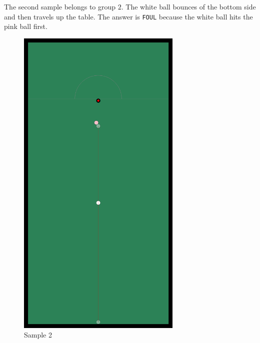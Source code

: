 The second sample belongs to group $2$. The white ball bounces of the bottom side and then travels up the table. The answer is \texttt{FOUL} because the white ball hits the pink ball first. 
\begin{figure}[ht!]
  \centering
    \includegraphics[width=0.7\textwidth]{sample2}
  \caption{Sample 2}
\end{figure}

